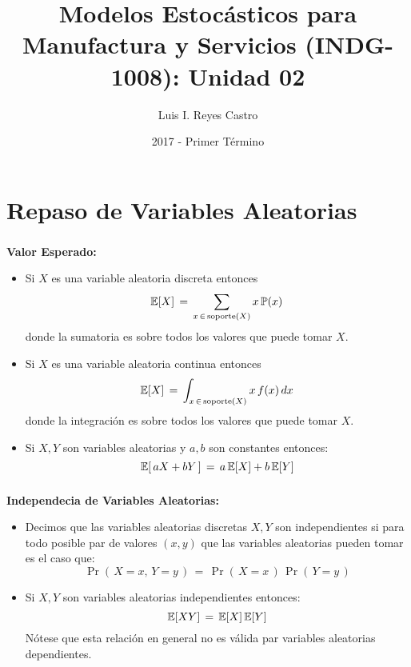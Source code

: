 \documentclass[ 10pt, xcolor = dvipsnames]{beamer}
\title[\shorttitle]{Modelos Estoc\'asticos para Manufactura y Servicios (INDG-1008): \textbf{Unidad 02} }
\author[L. I. Reyes Castro]{Luis I. Reyes Castro}
\institute[ESPOL]{\normalsize Escuela Superior Polit\'ecnica del Litoral (ESPOL) \\ Guayaquil - Ecuador}
\date[2017-T1]{2017 - Primer T\'ermino}
\begin{document}



\section{Repaso de Variables Aleatorias}

\begin{frame}[allowframebreaks]
\frametitle{\insertsection}

\textbf{Valor Esperado:}
\begin{itemize}
\item Si $X$ es una variable aleatoria discreta entonces 
\[
\mathbb{E}[X] \, = \, \sum_{ x \, \in \, \text{soporte}(X) } x \, \mathbb{P}(x)
\]
donde la sumatoria es sobre todos los valores que puede tomar $X$. 
\item Si $X$ es una variable aleatoria continua entonces 
\[
\mathbb{E}[X] \, = \, \int_{ x \, \in \, \text{soporte}(X) } x \, f(x) \, dx
\]
donde la integraci\'on es sobre todos los valores que puede tomar $X$. 
\item Si $X,Y$ son variables aleatorias y $a,b$ son constantes entonces: 
\[
\mathbb{E}[ \, a X + b Y \, ] \, = \, a \, \mathbb{E}[X] + b \, \mathbb{E}[Y]
\]
\end{itemize}

\end{frame}

\begin{frame}[allowframebreaks]
\frametitle{\insertsection}

\textbf{Independecia de Variables Aleatorias:}
\begin{itemize}
\item Decimos que las variables aleatorias discretas $X,Y$ son independientes si \linebreak para todo posible par de valores $(x,y)$ que las variables aleatorias \linebreak pueden tomar es el caso que: 
\[
\Pr( \, X = x, \, Y = y \, ) \, = \,
\Pr( \, X = x \, ) \, \Pr( \, Y = y \, )
\]
\item Si $X,Y$ son variables aleatorias independientes entonces: 
\[
\mathbb{E}[XY] \, = \, \mathbb{E}[X] \, \mathbb{E}[Y]
\]
N\'otese que esta relaci\'on en general no es v\'alida par variables aleatorias dependientes. 
\end{itemize}

\end{frame}
\end{document}

